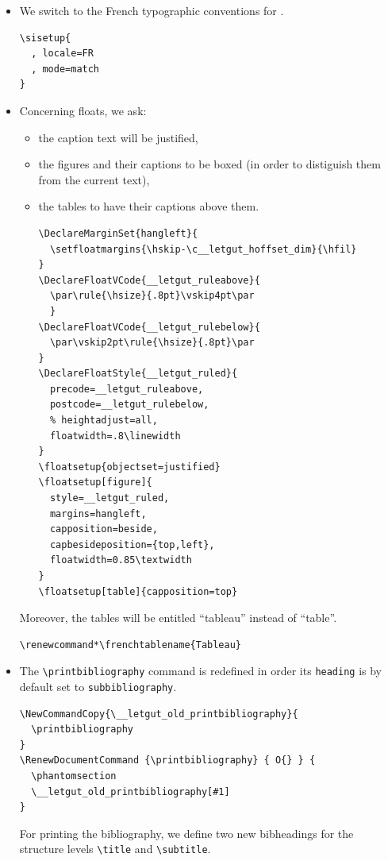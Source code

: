 \documentclass{letgut}
\begin{document}
\begin{itemize}
\item We switch to the French typographic conventions for .
\begin{lstlisting}
\sisetup{
  , locale=FR
  , mode=match
}
\end{lstlisting}
\item Concerning floats, we ask:
\begin{itemize}
\item the caption text will be justified,
\item the figures and their captions to be boxed (in order to distiguish them from
the current text),
\item the tables to have their captions above them.
\begin{lstlisting}
\DeclareMarginSet{hangleft}{
  \setfloatmargins{\hskip-\c__letgut_hoffset_dim}{\hfil}
}
\DeclareFloatVCode{__letgut_ruleabove}{
  \par\rule{\hsize}{.8pt}\vskip4pt\par
  }
\DeclareFloatVCode{__letgut_rulebelow}{
  \par\vskip2pt\rule{\hsize}{.8pt}\par
}
\DeclareFloatStyle{__letgut_ruled}{
  precode=__letgut_ruleabove,
  postcode=__letgut_rulebelow,
  % heightadjust=all,
  floatwidth=.8\linewidth
}
\floatsetup{objectset=justified}
\floatsetup[figure]{
  style=__letgut_ruled,
  margins=hangleft,
  capposition=beside,
  capbesideposition={top,left},
  floatwidth=0.85\textwidth
}
\floatsetup[table]{capposition=top}
\end{lstlisting}
\end{itemize}
Moreover, the tables will be entitled \enquote{tableau} instead of
\enquote{table}.
\begin{lstlisting}
\renewcommand*\frenchtablename{Tableau}
\end{lstlisting}
\item The \lstinline+\printbibliography+ command is redefined in order its \lstinline+heading+ is by
default set to \lstinline+subbibliography+.
\begin{lstlisting}
\NewCommandCopy{\__letgut_old_printbibliography}{
  \printbibliography
}
\RenewDocumentCommand {\printbibliography} { O{} } {
  \phantomsection
  \__letgut_old_printbibliography[#1]
}
\end{lstlisting}
 For printing the bibliography, we define two new bibheadings for the
structure levels \lstinline+\title+ and \lstinline+\subtitle+.
\begin{lstlisting}

\end{lstlisting}
\end{itemize}
\end{document}

